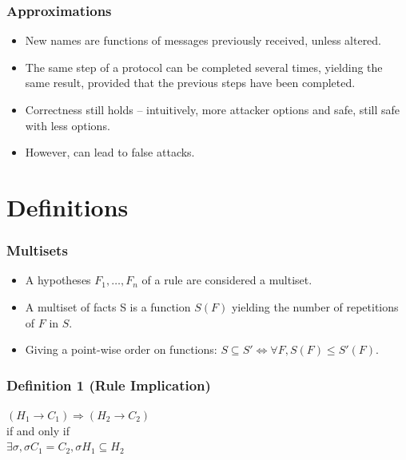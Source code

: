\documentclass[10pt]{beamer}
\begin{document}
\begin{frame}
  \frametitle{Approximations}

  \begin{itemize}
    \item New names are functions of messages previously received, unless altered.
    \item The same step of a protocol can be completed several times, yielding the same result, provided that the previous steps have been completed.\\[3em]
    \item Correctness still holds -- intuitively, more attacker options and safe, still safe with less options.
    \item However, can lead to false attacks.
  \end{itemize}
\end{frame}

\section{Definitions}

\begin{frame}
  \frametitle{Multisets}

  \begin{itemize}
    \item A hypotheses $F_1, \dots, F_n$ of a rule are considered a multiset.
    \item A multiset of facts S is a function $S(F)$ yielding the number of repetitions of $F$ in $S$.
    \item Giving a point-wise order on functions: $S \subseteq S' \Leftrightarrow \forall F, S(F) \leq S'(F)$.
  \end{itemize}
\end{frame}

\begin{frame}
  \frametitle{Definition 1 (Rule Implication)}
  \centering

  $(H_1 \rightarrow C_1) \Rightarrow (H_2 \rightarrow C_2)$\\
  if and only if\\
  $\exists \sigma, \sigma C_1 = C_2, \sigma H_1 \subseteq H_2$
\end{frame}
\end{document}
